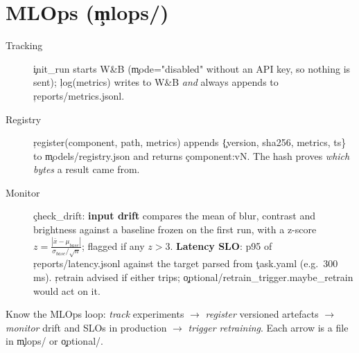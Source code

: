 \section{MLOps (\c{mlops/})}
\begin{description}
 \item[Tracking] \c{init\_run} starts W\&B (\c{mode="disabled"} without an API key, so nothing is sent); \c{log(metrics)} writes to W\&B \emph{and} always appends to \c{reports/metrics.jsonl}.
 \item[Registry] \c{register(component, path, metrics)} appends \c{\{version, sha256, metrics, ts\}} to \c{models/registry.json} and returns \c{component:vN}. The hash proves \emph{which bytes} a result came from.
 \item[Monitor] \c{check\_drift}: \textbf{input drift} compares the mean of blur, contrast and brightness against a baseline frozen on the first run, with a z-score $z=\frac{|\bar x-\mu_{base}|}{\sigma_{base}/\sqrt{n}}$; flagged if any $z>3$. \textbf{Latency SLO}: p95 of \c{reports/latency.jsonl} against the target parsed from \c{task.yaml} (e.g.\ 300 ms). \c{retrain} advised if either trips; \c{optional/retrain\_trigger.maybe\_retrain} would act on it.
\end{description}
\begin{tip}Know the MLOps loop: \emph{track} experiments $\to$ \emph{register} versioned artefacts $\to$ \emph{monitor} drift and SLOs in production $\to$ \emph{trigger retraining}. Each arrow is a file in \c{mlops/} or \c{optional/}.\end{tip}
